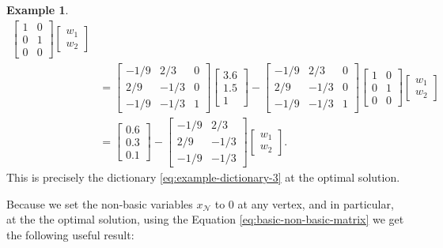 \documentclass[
]{book}
\theoremstyle{definition}
\theoremstyle{definition}
\newtheorem{example}{Example}[chapter]
\theoremstyle{definition}
\theoremstyle{definition}
\theoremstyle{remark}
\begin{document}
\begin{example}
\begin{align*}
\begin{bmatrix}
    1 & 0 \\
    0 & 1 \\
    0 & 0
    \end{bmatrix}
  \begin{bmatrix} w_1 \\ w_2 \end{bmatrix} \\
  & = \begin{bmatrix}
    -1/9 & 2/3 & 0 \\
    2/9 & -1/3 & 0 \\
    -1/9 & -1/3 & 1
    \end{bmatrix} 
    \begin{bmatrix}
    3.6 \\ 1.5 \\ 1 
    \end{bmatrix} - 
    \begin{bmatrix}
    -1/9 & 2/3 & 0 \\
    2/9 & -1/3 & 0 \\
    -1/9 & -1/3 & 1
    \end{bmatrix}  
    \begin{bmatrix}
    1 & 0 \\
    0 & 1 \\
    0 & 0
    \end{bmatrix}
  \begin{bmatrix} w_1 \\ w_2 \end{bmatrix} \\
  & 
  = \begin{bmatrix} 0.6 \\ 0.3 \\ 0.1 \end{bmatrix} 
  -
  \begin{bmatrix}
    -1/9 & 2/3 \\ 
    2/9 & -1/3 \\
    -1/9 & -1/3
  \end{bmatrix}
  \begin{bmatrix} w_1 \\ w_2 \end{bmatrix}.
\end{align*}
This is precisely the dictionary \eqref{eq:example-dictionary-3} at the optimal solution.
\end{example}

Because we set the non-basic variables \(x_{\mathcal{N}}\) to 0 at any vertex, and in particular, at the the optimal solution, using the Equation \eqref{eq:basic-non-basic-matrix} we get the following useful result:
\end{document}
